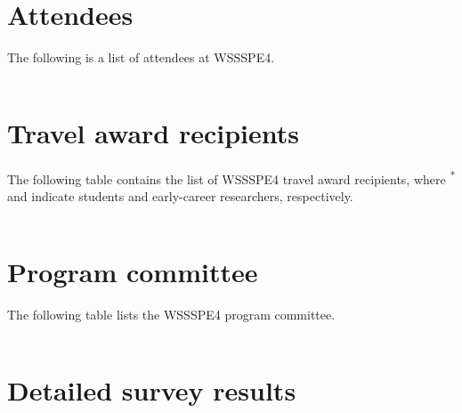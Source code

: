 \documentclass[11pt, oneside]{amsart}
\newcommand{\todo}[1]{{\color{blue}$\blacksquare$~\textsf{[TODO: #1]}}}
\begin{document}
\section{Attendees}  \label{sec:attendees}
The following is a list of attendees at WSSSPE4.

{\scriptsize
\begin{longtable}{lll}

\end{longtable}
}

\section{Travel award recipients}  \label{sec:awardees}
The following table contains the list of WSSSPE4 travel award recipients, where
\textsuperscript{*} and \textsuperscript{\textdagger} indicate students and
early-career researchers, respectively.

{\scriptsize
\begin{longtable}{lll}

\end{longtable}
}

\section{Program committee}  \label{sec:progcom}
The following table lists the WSSSPE4 program committee.

{\scriptsize
\begin{longtable}{lll}

\end{longtable}
}

\section{Detailed survey results}  \label{sec:survey_details}



%

\newpage



\end{document}
